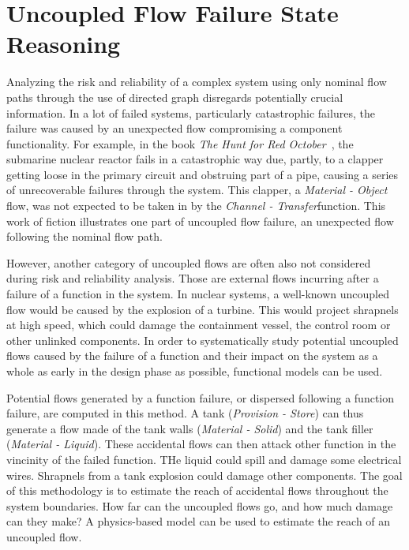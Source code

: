 \section{Uncoupled Flow Failure State Reasoning}

Analyzing the risk and reliability of a complex system using only nominal flow paths through the use of directed graph disregards potentially crucial information. In a lot of failed systems, particularly catastrophic failures, the failure was caused by an unexpected flow compromising a component functionality. For example, in the book \textit{The Hunt for Red October}~\cite{hunt01}, the submarine nuclear reactor fails in a catastrophic way due, partly, to a clapper getting loose in the primary circuit and obstruing part of a pipe, causing a series of unrecoverable failures through the system. This clapper, a \textit{Material - Object} flow, was not expected to be taken in by the \textit{Channel - Transfer}function. This work of fiction illustrates one part of uncoupled flow failure, an unexpected flow following the nominal flow path.

However, another category of uncoupled flows are often also not considered during risk and reliability analysis. Those are external flows incurring after a failure of a function in the system. In nuclear systems, a well-known uncoupled flow would be caused by the explosion of a turbine. This would project shrapnels at high speed, which could damage the containment vessel, the control room or other unlinked components. In order to systematically study potential uncoupled flows caused by the failure of a function and their impact on the system as a whole as early in the design phase as possible, functional models can be used.

Potential flows generated by a function failure, or dispersed following a function failure, are computed in this method. A tank (\textit{Provision - Store}) can thus generate a flow made of the tank walls (\textit{Material - Solid}) and the tank filler (\textit{Material - Liquid}). These accidental flows can then attack other function in the vincinity of the failed function. THe liquid could spill and damage some electrical wires. Shrapnels from a tank explosion could damage other components. The goal of this methodology is to estimate the reach of accidental flows throughout the system boundaries. How far can the uncoupled flows go, and how much damage can they make? A physics-based model can be used to estimate the reach of an uncoupled flow.

